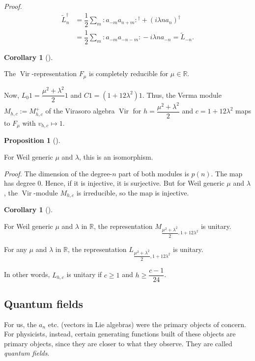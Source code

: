 \documentclass
[numbers=enddot,12pt,final,onecolumn,german,notitlepage]{scrartcl}%
\theoremstyle{definition}
\newtheorem{prop}[theo]{Proposition}
\newenvironment{proposition}[1][]
{\begin{prop}[#1]\begin{leftbar}}
{\end{leftbar}\end{prop}}
\newtheorem{coro}[theo]{Corollary}
\newenvironment{corollary}[1][]
{\begin{coro}[#1]\begin{leftbar}}
{\end{leftbar}\end{coro}}
\begin{document}
\textit{Proof.}
\begin{align*}
\widetilde{L}_{n}^{\dag}  &  =\dfrac{1}{2}\sum\limits_{m}\left.
:a_{-m}a_{n+m}:\right.  ^{\dag}+\left(  i\lambda na_{n}\right)  ^{\dag}\\
&  =\dfrac{1}{2}\sum\limits_{m}\left.  :a_{-m}a_{-n-m}:\right.  -i\lambda
na_{-n}=\widetilde{L}_{-n}.
\end{align*}


\begin{corollary}
The $\operatorname*{Vir}$-representation $F_{\mu}$ is completely reducible for
$\mu\in\mathbb{R}$.
\end{corollary}

Now, $L_{0}1=\dfrac{\mu^{2}+\lambda^{2}}{2}1$ and $C1=\left(  1+12\lambda
^{2}\right)  1$. Thus, the Verma module $M_{h,c}:=M_{h,c}^{+}$ of the Virasoro
algebra $\operatorname*{Vir}$ for $h=\dfrac{\mu^{2}+\lambda^{2}}{2}$ and
$c=1+12\lambda^{2}$ maps to $F_{\mu}$ with $v_{h,c}\mapsto1$.

\begin{proposition}
For Weil generic $\mu$ and $\lambda$, this is an isomorphism.
\end{proposition}

\textit{Proof.} The dimension of the degree-$n$ part of both modules is
$p\left(  n\right)  $. The map has degree $0$. Hence, if it is injective, it
is surjective. But for Weil generic $\mu$ and $\lambda$, the
$\operatorname*{Vir}$-module $M_{h,c}$ is irreducible, so the map is injective.

\begin{corollary}
For Weil generic $\mu$ and $\lambda$ in $\mathbb{R}$, the representation
$M_{\dfrac{\mu^{2}+\lambda^{2}}{2},1+12\lambda^{2}}$ is unitary.

For any $\mu$ and $\lambda$ in $\mathbb{R}$, the representation $L_{\dfrac
{\mu^{2}+\lambda^{2}}{2},1+12\lambda^{2}}$ is unitary.

In other words, $L_{h,c}$ is unitary if $c\geq1$ and $h\geq\dfrac{c-1}{24}$.
\end{corollary}

\subsection{Quantum fields}

For us, the $a_{n}$ etc. (vectors in Lie algebras) were the primary objects of
concern. For physicists, instead, certain generating functions built of these
objects are primary objects, since they are closer to what they observe. They
are called \textit{quantum fields}.
\end{document}
